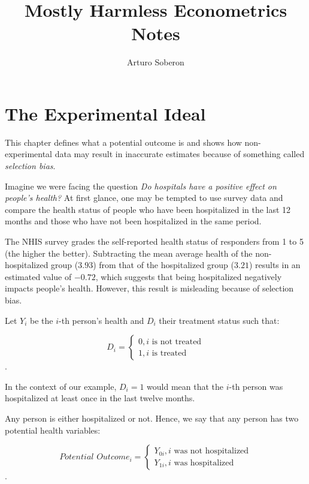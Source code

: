 \documentclass[12pt]{article}
\begin{document}
\title{Mostly Harmless Econometrics Notes}
\author{Arturo Soberon}
\maketitle

\setcounter{section}{1}
\section{The Experimental Ideal}
This chapter defines what a potential outcome is and shows how non-experimental
data may result in inaccurate estimates because of something called 
\textit{selection bias}.

Imagine we were facing the question \textit{Do hospitals have a positive
effect on people's health?} At first glance, one may be tempted to use survey
data and compare the health status of people who have been hospitalized in the
last 12 months and those who have not been hospitalized in the same period.

The NHIS survey grades the self-reported health status of responders from 1 to 
5 (the higher the better). Subtracting the mean average health of the
non-hospitalized group ($3.93$) from that of the hospitalized group ($3.21$)
results in an estimated value of $-0.72$, which suggests that being
hospitalized negatively impacts people's health. However, this result is
misleading because of selection bias.

Let $Y_i$ be the $i$-th person's health and $D_i$ their treatment status such
that:

\begin{equation*}
    D_i = 
    \begin{cases}
        0, \text{$i$ is not treated} \\
        1, \text{$i$ is treated}
    \end{cases}
\end{equation*}.

\noindent In the context of our example, $D_i = 1$ would mean that the $i$-th
person was hospitalized at least once in the last twelve months.

Any person is either hospitalized or not. Hence, we say that any person has two
potential health variables:

\begin{equation*}
    \textit{Potential Outcome}_i = 
    \begin{cases}
        Y_{0i}, \text{$i$ was not hospitalized} \\
        Y_{1i}, \text{$i$ was hospitalized}
    \end{cases}
\end{equation*}.
\end{document}
